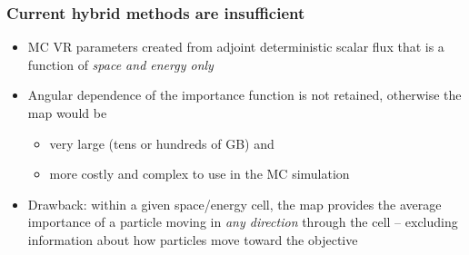 \documentclass[xcolor=x11names,compress]{beamer}
\renewcommand{\(}{\begin{columns}}
\renewcommand{\)}{\end{columns}}
\newcommand{\<}[1]{\begin{column}{#1}}
\renewcommand{\>}{\end{column}}
\begin{document}
\begin{frame}[fragile]
  \frametitle{Current hybrid methods are insufficient}

	\begin{itemize}
	\item MC VR parameters created from adjoint deterministic scalar flux that is a function of \textit{space and energy only} \vspace*{1 em}
	\item Angular dependence of the importance function is not retained, otherwise the map would be 
	\begin{itemize}
	  \item very large (tens or hundreds of GB) and
	  \item  more costly and complex to use in the MC simulation 
	\end{itemize}
	\item Drawback: within a given space/energy cell, the map provides the average importance of a particle moving in \textit{any direction} through the cell -- excluding information about how particles move \alert{toward the objective}
	\end{itemize}

\end{frame}
\end{document}
